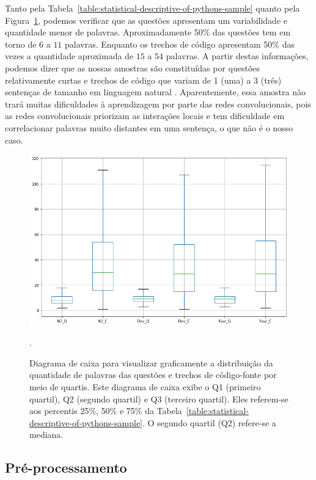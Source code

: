 Tanto pela Tabela~\ref{table:statistical-descriptive-of-pythons-sample} quanto pela Figura~\ref{fig:boxplot-number-of-words}, podemos verificar que as questões apresentam um variabilidade e quantidade menor de palavras. Aproximadamente 50\% das questões tem em torno de $6$ a $11$ palavras. Enquanto os trechos de código apresentam 50\% das vezes a quantidade aproximada de $15$ a $54$ palavras. A partir destas informações, podemos dizer que as nossas amostras são constituídas por questões relativamente curtas e trechos de código que variam de 1 (uma) a 3 (três) sentenças de tamanho em linguagem natural \citep{casi-newell-sentence-length-2018}. Aparentemente, essa amostra não trará muitas dificuldades à aprendizagem por parte das redes convolucionais, pois as redes convolucionais priorizam as interações locais e tem dificuldade em correlacionar palavras muito distantes em uma sentença, o que não é o nosso caso.



\begin{figure}[h]
\centering
\includegraphics[width=1\textwidth]{figuras/cap-experimento/boxplot_number_of_words.png}
\caption{Diagrama de caixa para visualizar graficamente a distribuição da quantidade de palavras das questões e trechos de código-fonte por meio de quartis. Este diagrama de caixa exibe o Q1 (primeiro quartil), Q2 (segundo quartil) e Q3 (terceiro quartil). Eles referem-se aos percentis 25\%, 50\% e 75\% da Tabela~\ref{table:statistical-descriptive-of-pythons-sample}. O segundo quartil (Q2) refere-se a mediana. }. 
\label{fig:boxplot-number-of-words}
\end{figure}

\subsection{Pré-processamento}
\label{sec:pre-processamento}


